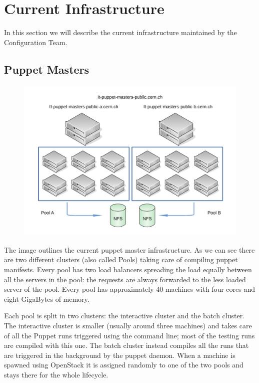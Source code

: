 \section{Current Infrastructure}

In this section we will describe the current infrastructure maintained by
the Configuration Team.

\subsection{Puppet Masters}


\begin{figure}[H]
\includegraphics[width=\textwidth,height=\textheight,keepaspectratio]{ConfigurationManagement/Infrastructure_pm.jpg}
\end{figure}

The image outlines the current puppet master infrastructure. As we can see
there are two different clusters (also called Pools) taking care of
compiling puppet manifests. Every pool has two load balancers spreading
the load equally between all the servers in the pool: the requests are
always forwarded to the less loaded server of the pool. Every pool has
approximately 40 machines with four cores and eight GigaBytes of memory.

Each pool is split in two clusters: the interactive cluster and the batch
cluster. The interactive cluster is smaller (usually around three
machines) and takes care of all the Puppet runs triggered using the
command line; most of the testing runs are compiled with this one. The
batch cluster instead compiles all the runs that are triggered in the
background by the puppet daemon. When a machine is spawned using OpenStack
it is assigned randomly to one of the two pools and stays there for the
whole lifecycle.

